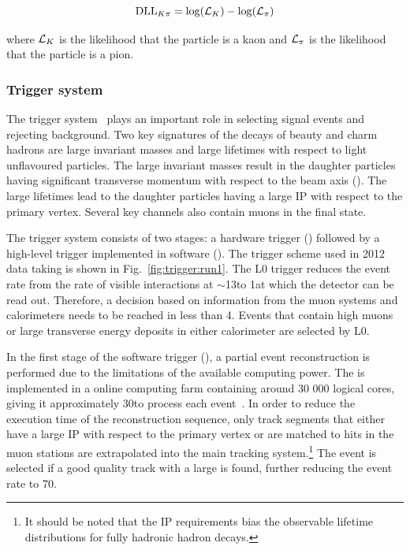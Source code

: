 \begin{equation}
\mathrm{DLL}_{{K}{\pi}} = \log(\mathcal{L}_{{K}}) - \log(\mathcal{L}_{{\pi}})
\end{equation}

\noindent where $\mathcal{L}_{{K}}$ is the likelihood that the particle is a kaon and $\mathcal{L}_{{\pi}}$ is the likelihood that the particle is a pion.
\subsubsection{Trigger system}
\label{detector:trigger}

The \lhcb trigger system~\cite{LHCb-TDR-010,LHCb-DP-2012-004} plays an important role in selecting signal events and rejecting background. Two key signatures of the decays of beauty and charm hadrons are large invariant masses and large lifetimes with respect to light unflavoured particles. The large invariant masses result in the daughter particles having significant transverse momentum with respect to the beam axis (\pt). The large lifetimes lead to the daughter particles having a large IP with respect to the primary vertex. Several key channels also contain muons in the final state.

The trigger system consists of two stages: a hardware trigger (\lone) followed by a high-level trigger implemented in software (\hlt). The trigger scheme used in 2012 data taking is shown in Fig.~\ref{fig:trigger:run1}. The L0 trigger reduces the event rate from the rate of visible interactions at $\sim$13\mhz to 1\mhz at which the \lhcb detector can be read out. Therefore, a decision based on information from the muon systems and calorimeters needs to be reached in less than 4\mus. Events that contain high \pt muons or large transverse energy deposits in either calorimeter are selected by L0.

In the first stage of the software trigger (\hltone), a partial event reconstruction is performed due to the limitations of the available computing power. The \hlt is implemented in a online computing farm containing around 30 000 logical cores, giving it approximately 30\ms to process each event~\cite{trigger-cpu}. In order to reduce the execution time of the reconstruction sequence, only \velo track segments that either have a large IP with respect to the primary vertex or are matched to hits in the muon stations are extrapolated into the main tracking system.{\footnote{It should be noted that the IP requirements bias the observable lifetime distributions for fully hadronic \bquark hadron decays.}} The event is selected if a good quality track with a large \pt is found, further reducing the event rate to 70\khz. 

